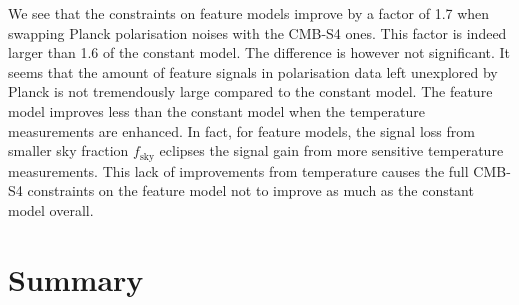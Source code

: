 
We see that the constraints on feature models improve by a factor of 1.7 when swapping Planck polarisation noises with the CMB-S4 ones. This factor is indeed larger than 1.6 of the constant model. The difference is however not significant. It seems that the amount of feature signals in polarisation data left unexplored by Planck is not tremendously large compared to the constant model. The feature model improves less than the constant model when the temperature measurements are enhanced. In fact, for feature models, the signal loss from smaller sky fraction $f_\text{sky}$ eclipses the signal gain from more sensitive temperature measurements. This lack of improvements from temperature causes the full CMB-S4 constraints on the feature model not to improve as much as the constant model overall.

\newpage
\section*{Summary} 

